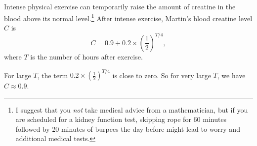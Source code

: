 \documentclass[12pt,fleqn,answers]{exam}
\begin{document}
\begin{questions}
\begin{solution}[1.5in]
\end{solution}

\question Intense physical exercise can temporarily raise the amount
of creatine in the blood above its normal level.\footnote{I suggest
that you \emph{not} take medical advice from a mathematician, but
if you are scheduled for a kidney function test, skipping rope
for 60 minutes followed by 20 minutes of burpees the day 
before might lead to worry and additional medical tests.} After intense exercise,
 Martin's blood creatine level $C$ is 
\begin{equation*}
    C = 0.9 + 0.2 \times \left(\frac{1}{2} \right)^{T/4},
\end{equation*}
where $T$ is the number of hours after exercise. 
\begin{solution} For large $T$, the term $0.2 
   \times \left(\frac{1}{2} \right)^{T/4}$ is close to zero. So
   for very large $T$, we have $C \approx 0.9$.

\end{solution}
\end{questions}
\end{document}
